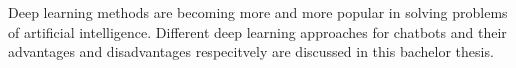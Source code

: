 \section*{}
Deep learning methods are becoming more and more popular in solving problems of artificial intelligence. Different deep learning approaches for chatbots and their advantages and disadvantages respecitvely are discussed in this bachelor thesis.

